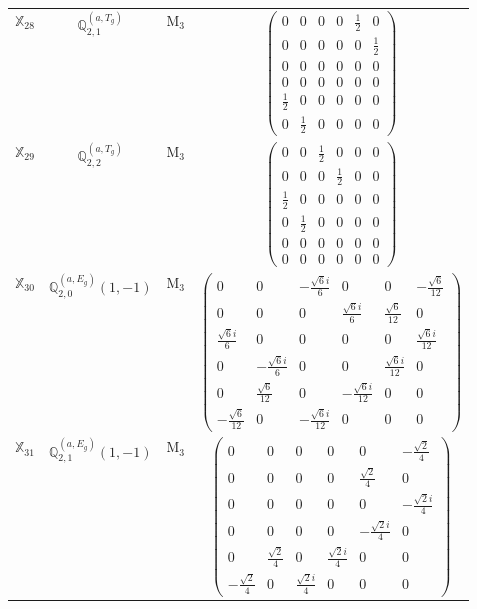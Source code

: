 \documentclass[fleqn,10pt,landscape]{article}
\begin{document}
\begin{itemize}
\begin{center}
\begin{longtable}{c|c|c|c}
$ \mathbb{X}_{28} $ & $\mathbb{Q}_{2,1}^{(a,T_{g})}$ & M$_{3}$ & $\begin{pmatrix} 0 & 0 & 0 & 0 & \frac{1}{2} & 0 \\ 0 & 0 & 0 & 0 & 0 & \frac{1}{2} \\ 0 & 0 & 0 & 0 & 0 & 0 \\ 0 & 0 & 0 & 0 & 0 & 0 \\ \frac{1}{2} & 0 & 0 & 0 & 0 & 0 \\ 0 & \frac{1}{2} & 0 & 0 & 0 & 0 \end{pmatrix}$ \\
$ \mathbb{X}_{29} $ & $\mathbb{Q}_{2,2}^{(a,T_{g})}$ & M$_{3}$ & $\begin{pmatrix} 0 & 0 & \frac{1}{2} & 0 & 0 & 0 \\ 0 & 0 & 0 & \frac{1}{2} & 0 & 0 \\ \frac{1}{2} & 0 & 0 & 0 & 0 & 0 \\ 0 & \frac{1}{2} & 0 & 0 & 0 & 0 \\ 0 & 0 & 0 & 0 & 0 & 0 \\ 0 & 0 & 0 & 0 & 0 & 0 \end{pmatrix}$ \\
$ \mathbb{X}_{30} $ & $\mathbb{Q}_{2,0}^{(a,E_{g})}(1,-1)$ & M$_{3}$ & $\begin{pmatrix} 0 & 0 & - \frac{\sqrt{6} i}{6} & 0 & 0 & - \frac{\sqrt{6}}{12} \\ 0 & 0 & 0 & \frac{\sqrt{6} i}{6} & \frac{\sqrt{6}}{12} & 0 \\ \frac{\sqrt{6} i}{6} & 0 & 0 & 0 & 0 & \frac{\sqrt{6} i}{12} \\ 0 & - \frac{\sqrt{6} i}{6} & 0 & 0 & \frac{\sqrt{6} i}{12} & 0 \\ 0 & \frac{\sqrt{6}}{12} & 0 & - \frac{\sqrt{6} i}{12} & 0 & 0 \\ - \frac{\sqrt{6}}{12} & 0 & - \frac{\sqrt{6} i}{12} & 0 & 0 & 0 \end{pmatrix}$ \\
$ \mathbb{X}_{31} $ & $\mathbb{Q}_{2,1}^{(a,E_{g})}(1,-1)$ & M$_{3}$ & $\begin{pmatrix} 0 & 0 & 0 & 0 & 0 & - \frac{\sqrt{2}}{4} \\ 0 & 0 & 0 & 0 & \frac{\sqrt{2}}{4} & 0 \\ 0 & 0 & 0 & 0 & 0 & - \frac{\sqrt{2} i}{4} \\ 0 & 0 & 0 & 0 & - \frac{\sqrt{2} i}{4} & 0 \\ 0 & \frac{\sqrt{2}}{4} & 0 & \frac{\sqrt{2} i}{4} & 0 & 0 \\ - \frac{\sqrt{2}}{4} & 0 & \frac{\sqrt{2} i}{4} & 0 & 0 & 0 \end{pmatrix}$ \\

\end{longtable}
\end{center}
\end{itemize}
\end{document}
